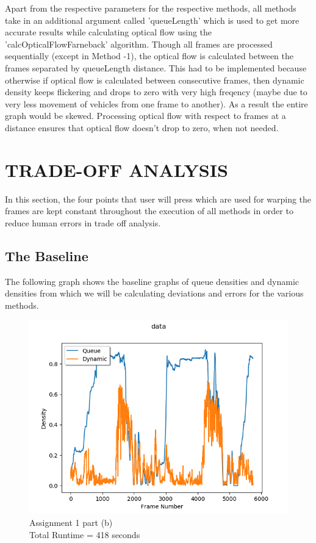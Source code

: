 \documentclass[paper=a4, fontsize = 12pt]{scrartcl}
\numberwithin{equation}{section}		%
\numberwithin{figure}{section}			%
\numberwithin{table}{section}				%
\begin{document}
Apart from the respective parameters for the respective methods, all methods take in an additional argument called 'queueLength' which is used to get more accurate results while calculating optical flow using the 'calcOpticalFlowFarneback' algorithm. Though all frames are processed sequentially (except in Method -1), the optical flow is calculated between the frames separated by queueLength distance. This had to be implemented because otherwise if optical flow is calculated between consecutive frames, then dynamic density keeps flickering and drops to zero with very high freqency (maybe due to very less movement of vehicles from one frame to another). As a result the entire graph would be skewed. Processing optical flow with respect to frames at a distance ensures that optical flow doesn't drop to zero, when not needed.








\section{TRADE-OFF ANALYSIS}

In this section, the four points that user will press which are used for warping the frames are kept constant throughout the execution of all methods in order to reduce human errors in trade off analysis.
\subsection{The Baseline}
The following graph shows the baseline graphs of queue densities and dynamic densities from which we will be calculating deviations and errors for the various methods. \\

\begin{figure}[ht!]
    \centering
    \captionsetup{justification=centering,margin=2cm}
    \includegraphics[width=15cm]{data.png}
    \caption{ Assignment 1 part (b)\\Total Runtime = 418 seconds}
    \label{fig:baseline}
\end{figure}
\end{document}
